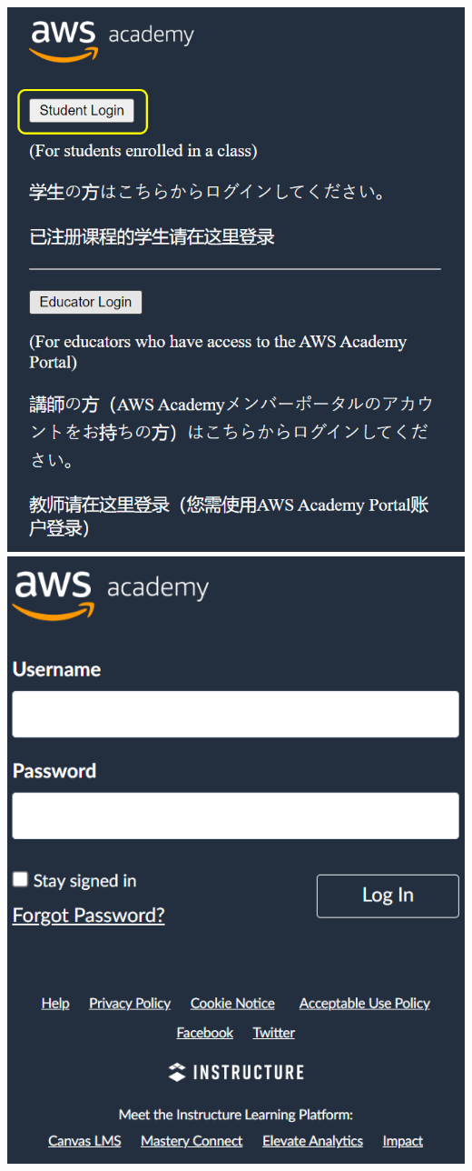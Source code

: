 \begin{enumerate}
    \hspace{9mm}
    \includegraphics[height=0.35\textheight]{images/labs-login1}
    \hspace{5mm}
    \includegraphics[height=0.35\textheight]{images/labs-login2}
\end{enumerate}


